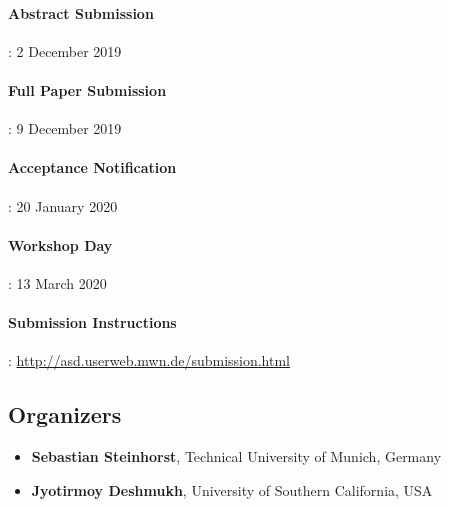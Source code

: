 \documentclass[a4paper,10pt] {article}
\begin{document}
\paragraph{Abstract Submission}: 2 December 2019
\vspace{-0.5 cm}
\paragraph{Full Paper Submission}: 9 December 2019
\vspace{-0.5 cm}
\paragraph{Acceptance Notification}: 20 January 2020
\vspace{-0.5 cm}
\paragraph{Workshop Day}: 13 March 2020
\vspace{-0.5 cm}
\paragraph{Submission Instructions}: \href{http://asd.userweb.mwn.de/submission.html}{http://asd.userweb.mwn.de/submission.html} 
\subsection*{Organizers}
\begin{itemize}[noitemsep]
\item \textbf{Sebastian Steinhorst}, Technical University of Munich, Germany %
\item \textbf{Jyotirmoy Deshmukh}, University of Southern California, USA  \end{itemize}
\end{document}
